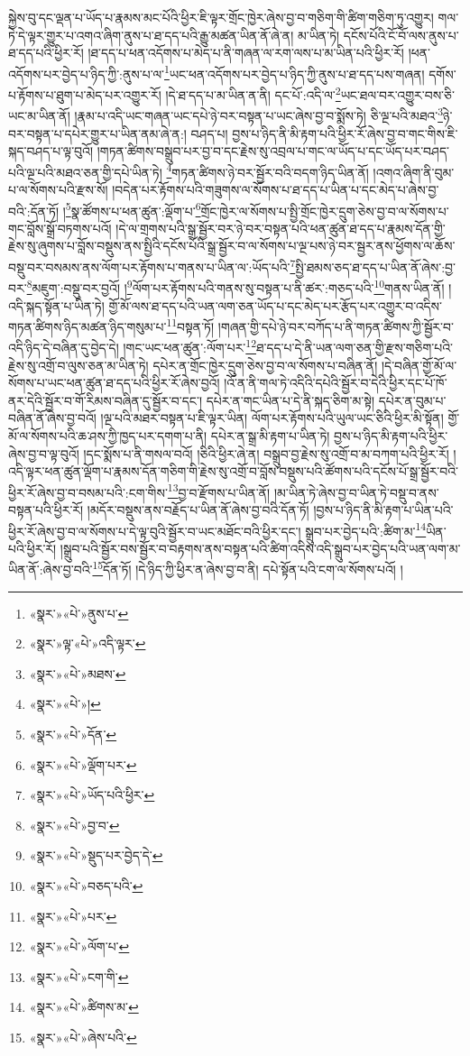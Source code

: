 སྐྱེས་བུ་དང་ལྡན་པ་ཡོད་པ་རྣམས་མང་པོའི་ཕྱིར་ཇི་ལྟར་གྲོང་ཁྱེར་ཞེས་བྱ་བ་གཅིག་གི་ཚིག་གཅིག་ཏུ་འགྱུར། གལ་ཏེ་དེ་ལྟར་གྱུར་པ་འགའ་ཞིག་ནུས་པ་ཐ་དད་པའི་རྒྱུ་མཚན་ཡིན་ནོ་ཞེ་ན། མ་ཡིན་ཏེ། དངོས་པོའི་ངོ་བོ་ལས་ནུས་པ་ཐ་དད་པའི་ཕྱིར་རོ། །ཐ་དད་པ་ཕན་འདོགས་པ་མེད་པ་ནི་གཞན་ལ་རག་ལས་པ་མ་ཡིན་པའི་ཕྱིར་རོ། །ཕན་འདོགས་པར་བྱེད་པ་ཉིད་ཀྱི་:ནུས་པ་ལ་\footnote{«སྣར་»«པེ་»ནུས་པ་}ཡང་ཕན་འདོགས་པར་བྱེད་པ་ཉིད་ཀྱི་ནུས་པ་ཐ་དད་པས་གཞན། དགོས་པ་རྟོགས་པ་ཐུག་པ་མེད་པར་འགྱུར་རོ། །དེ་ཐ་དད་པ་མ་ཡིན་ན་ནི། དང་པོ་:འདི་ལ་\footnote{«སྣར་»ལྟ་«པེ་»འདི་ལྟར་}ཡང་ཐལ་བར་འགྱུར་བས་ཅི་ཡང་མ་ཡིན་ནོ། །རྣམ་པ་འདི་ཡང་གཞན་ཡང་དཔེ་ཉེ་བར་བསྟན་པ་ཡང་ཞེས་བྱ་བ་སྨོས་ཏེ། ཅི་ལྔ་པའི་མཐའ་\footnote{«སྣར་»«པེ་»མཐས་}ཉེ་བར་བསྟན་པ་དཔེར་གྱུར་པ་ཡིན་ནམ་ཞེ་ན:། བཤད་པ། བྱས་པ་ཉིད་ནི་མི་རྟག་པའི་ཕྱིར་རོ་ཞེས་བྱ་བ་གང་གིས་ཇི་སྐད་བཤད་པ་ལྟ་བུའོ། །གཏན་ཚིགས་བསྒྲུབ་པར་བྱ་བ་དང་རྗེས་སུ་འབྲལ་པ་གང་ལ་ཡོད་པ་དང་ཡོད་པར་བཤད་པའི་ལྔ་པའི་མཐའ་ཅན་གྱི་དཔེ་ཡིན་ཏེ། \footnote{«སྣར་»«པེ་»།  }གཏན་ཚིགས་ཉེ་བར་སྦྱོར་བའི་བདག་ཉིད་ཡིན་ནོ། །འགའ་ཞིག་ནི་བུམ་པ་ལ་སོགས་པའི་རྫས་སོ། །བདེན་པར་རྟོགས་པའི་གཟུགས་ལ་སོགས་པ་ཐ་དད་པ་ཡིན་པ་དང་མེད་པ་ཞེས་བྱ་བའི་:དོན་ཏོ། །\footnote{«སྣར་»«པེ་»དོན་}སྣ་ཚོགས་པ་ཕན་ཚུན་:ལྡོག་པ་\footnote{«སྣར་»«པེ་»ལྡོག་པར་}གྲོང་ཁྱེར་ལ་སོགས་པ་སྤྱི་གྲོང་ཁྱེར་དྲུག་ཅེས་བྱ་བ་ལ་སོགས་པ་གང་བློས་སྒྲོ་བཏགས་པའོ། །དེ་ལ་གྲགས་པའི་སྒྲ་སྦྱོར་བར་ཉེ་བར་བསྟན་པའི་ཕན་ཚུན་ཐ་དད་པ་རྣམས་དོན་གྱི་རྗེས་སུ་ཞུགས་པ་བློས་བསྡུས་ནས་སྤྱིའི་དངོས་པོའི་སྒྲ་སྦྱོར་བ་ལ་སོགས་པ་ལྔ་པས་ཉེ་བར་སྦྱར་ནས་ཕྱོགས་ལ་ཆོས་བསྡུ་བར་བསམས་ནས་ལོག་པར་རྟོགས་པ་གནས་པ་ཡིན་ལ་:ཡོད་པའི་\footnote{«སྣར་»«པེ་»ཡོད་པའི་ཕྱིར་}སྤྱི་ཐམས་ཅད་ཐ་དད་པ་ཡིན་ནོ་ཞེས་:བྱ་བར་\footnote{«སྣར་»«པེ་»བྱ་བ་}མཇུག་:བསྡུ་བར་བྱའོ། །\footnote{«སྣར་»«པེ་»སྡུད་པར་བྱེད་དེ་}ལོག་པར་རྟོགས་པའི་གནས་སུ་བསྟན་པ་ནི་ཚར་:གཅད་པའི་\footnote{«སྣར་»«པེ་»བཅད་པའི་}གནས་ཡིན་ནོ། །འདི་སྐད་སྟོན་པ་ཡིན་ཏེ། གྱོ་མོ་ལས་ཐ་དད་པའི་ཡན་ལག་ཅན་ཡོད་པ་དང་མེད་པར་རྩོད་པར་འགྱུར་བ་འདིས་གཏན་ཚིགས་ཉིད་མཚན་ཉིད་གསུམ་པ་\footnote{«སྣར་»«པེ་»པར་}བསྟན་ཏོ། །གཞན་གྱི་དཔེ་ཉེ་བར་བཀོད་པ་ནི་གཏན་ཚིགས་ཀྱི་སྦྱོར་བ་འདི་ཉིད་དེ་བཞིན་དུ་བྱེད་དེ། །གང་ཡང་ཕན་ཚུན་:ལོག་པར་\footnote{«སྣར་»«པེ་»ལོག་པ་}ཐ་དད་པ་དེ་ནི་ཡན་ལག་ཅན་གྱི་རྫས་གཅིག་པའི་རྗེས་སུ་འགྲོ་བ་ལུས་ཅན་མ་ཡིན་ཏེ། དཔེར་ན་གྲོང་ཁྱེར་དྲུག་ཅེས་བྱ་བ་ལ་སོགས་པ་བཞིན་ནོ། །དེ་བཞིན་གྱོ་མོ་ལ་སོགས་པ་ཡང་ཕན་ཚུན་ཐ་དད་པའི་ཕྱིར་རོ་ཞེས་བྱའོ། །འོ་ན་ནི་གལ་ཏེ་འདིའི་དཔེའི་སྦྱོར་བ་དེའི་ཕྱིར་དང་པོ་ཁོ་ནར་དེའི་སྦྱོར་བ་གོ་རིམས་བཞིན་དུ་སྦྱོར་བ་དང་། དཔེར་ན་གང་ཡིན་པ་དེ་ནི་སྐད་ཅིག་མ་སྟེ། དཔེར་ན་བུམ་པ་བཞིན་ནོ་ཞེས་བྱ་བའོ། །ལྔ་པའི་མཐར་བསྟན་པ་ཇི་ལྟར་ཡིན། ལོག་པར་རྟོགས་པའི་ཡུལ་ཡང་ཅིའི་ཕྱིར་མི་སྟོན། གྱོ་མོ་ལ་སོགས་པའི་ཆ་ཤས་ཀྱི་ཁྱད་པར་དགག་པ་ནི། དཔེར་ན་སྒྲ་མི་རྟག་པ་ཡིན་ཏེ། བྱས་པ་ཉིད་མི་རྟག་པའི་ཕྱིར་ཞེས་བྱ་བ་ལྟ་བུའོ། །དང་སྨོས་པ་ནི་གསལ་བའོ། །ཅིའི་ཕྱིར་ཞེ་ན། བསྒྲུབ་བྱ་རྗེས་སུ་འགྲོ་བ་མ་བཀག་པའི་ཕྱིར་རོ། །འདི་ལྟར་ཕན་ཚུན་ལྡོག་པ་རྣམས་དོན་གཅིག་གི་རྗེས་སུ་འགྲོ་བ་བློས་བསྡུས་པའི་ཚོགས་པའི་དངོས་པོ་སྒྲ་སྦྱོར་བའི་ཕྱིར་རོ་ཞེས་བྱ་བ་བསམ་པའི་:ངག་གིས་\footnote{«སྣར་»«པེ་»ངག་གི་}བྱ་བ་རྫོགས་པ་ཡིན་ནོ། །མ་ཡིན་ཏེ་ཞེས་བྱ་བ་ཡིན་ཏེ་བསྡུ་བ་ནས་བསྟན་པའི་ཕྱིར་རོ། །མདོར་བསྡུས་ནས་བརྗོད་པ་ཡིན་ནོ་ཞེས་བྱ་བའི་དོན་ཏོ། །བྱས་པ་ཉིད་ནི་མི་རྟག་པ་ཡིན་པའི་ཕྱིར་རོ་ཞེས་བྱ་བ་ལ་སོགས་པ་དེ་ལྟ་བུའི་སྦྱོར་བ་ཡང་མཐོང་བའི་ཕྱིར་དང་། སྒྲུབ་པར་བྱེད་པའི་:ཚིག་མ་\footnote{«སྣར་»«པེ་»ཚིགས་མ་}ཡིན་པའི་ཕྱིར་རོ། །སྒྲུབ་པའི་སྦྱོར་བས་སྦྱོར་བ་བརྟགས་ནས་བསྟན་པའི་ཚིག་འདིས་འདི་སྒྲུབ་པར་བྱེད་པའི་ཡན་ལག་མ་ཡིན་ནོ་:ཞེས་བྱ་བའི་\footnote{«སྣར་»«པེ་»ཞེས་པའི་}དོན་ཏོ། །དེ་ཉིད་ཀྱི་ཕྱིར་ན་ཞེས་བྱ་བ་ནི། དཔེ་སྟོན་པའི་ངག་ལ་སོགས་པའོ། །
